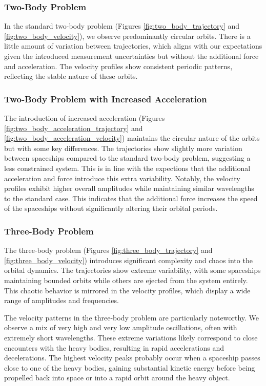 \documentclass[12pt,a4paper]{article}
\begin{document}
\subsubsection{Two-Body Problem}
In the standard two-body problem (Figures \ref{fig:two_body_trajectory} and \ref{fig:two_body_velocity}), we observe predominantly circular orbits. There is a little amount of variation between trajectories, which aligns with our expectations given the introduced measurement uncertainties but without the additional force and acceleration. The velocity profiles show consistent periodic patterns, reflecting the stable nature of these orbits.

\subsubsection{Two-Body Problem with Increased Acceleration}
The introduction of increased acceleration (Figures \ref{fig:two_body_acceleration_trajectory} and \ref{fig:two_body_acceleration_velocity}) maintains the circular nature of the orbits but with some key differences. The trajectories show slightly more variation between spaceships compared to the standard two-body problem, suggesting a less constrained system. This is in line with the expections that the additional acceleration and force introduce this extra variability. Notably, the velocity profiles exhibit higher overall amplitudes while maintaining similar wavelengths to the standard case. This indicates that the additional force increases the speed of the spaceships without significantly altering their orbital periods.

\subsubsection{Three-Body Problem}
The three-body problem (Figures \ref{fig:three_body_trajectory} and \ref{fig:three_body_velocity}) introduces significant complexity and chaos into the orbital dynamics. The trajectories show extreme variability, with some spaceships maintaining bounded orbits while others are ejected from the system entirely. This chaotic behavior is mirrored in the velocity profiles, which display a wide range of amplitudes and frequencies.

The velocity patterns in the three-body problem are particularly noteworthy. We observe a mix of very high and very low amplitude oscillations, often with extremely short wavelengths. These extreme variations likely correspond to close encounters with the heavy bodies, resulting in rapid accelerations and decelerations. The highest velocity peaks probably occur when a spaceship passes close to one of the heavy bodies, gaining substantial kinetic energy before being propelled back into space or into a rapid orbit around the heavy object.
\end{document}
